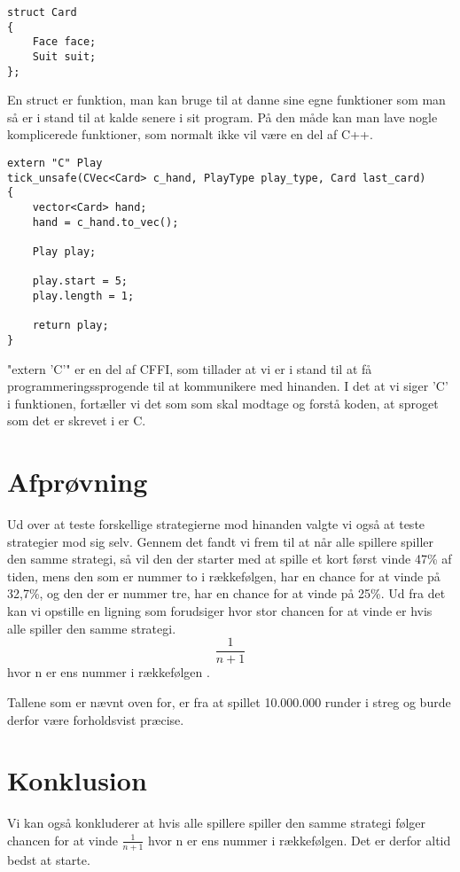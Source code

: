 \documentclass[a4paper, 12pt]{article}
\begin{document}
\begin{verbatim}
struct Card
{
	Face face;
	Suit suit;
};
\end{verbatim}
En struct er funktion, man kan bruge til at danne sine egne funktioner som man så er i stand til at kalde senere i sit program. På den måde kan man lave nogle komplicerede funktioner, som normalt ikke vil være en del af C++.
\pagebreak

\begin{verbatim}
extern "C" Play
tick_unsafe(CVec<Card> c_hand, PlayType play_type, Card last_card)
{
	vector<Card> hand;
	hand = c_hand.to_vec();

	Play play;

	play.start = 5;
	play.length = 1;

	return play;
}
\end{verbatim}
"extern 'C'" er en del af CFFI, som tillader at vi er i stand til at få programmeringssprogende til at kommunikere med hinanden. I det at vi siger 'C' i funktionen, fortæller vi det som som skal modtage og forstå koden, at sproget som det er skrevet i er C.
\vfill
\pagebreak

\begin{multicols}{2}
\section{Afprøvning}
Ud over at teste forskellige strategierne mod hinanden valgte vi også at teste strategier mod sig selv. Gennem det fandt vi frem til at når alle spillere spiller den samme strategi, så vil den der starter med at spille et kort først vinde 47\% af tiden, mens den som er nummer to i rækkefølgen, har en chance for at vinde på 32,7\%, og den der er nummer tre, har en chance for at vinde på 25\%. Ud fra det kan vi opstille en ligning som forudsiger hvor stor chancen for at vinde er hvis alle spiller den samme strategi.
$$\frac{1}{n+1}$$ hvor n er ens nummer i rækkefølgen . 

Tallene som er nævnt oven for, er fra at spillet 10.000.000 runder i streg og burde derfor være forholdsvist præcise. 

\section{Konklusion}


Vi kan også konkluderer at hvis alle spillere spiller den samme strategi følger chancen for at vinde $\frac{1}{n+1}$ hvor n er ens nummer i rækkefølgen. Det er derfor altid bedst at starte.
\bigbreak

\vfill
\pagebreak

\end{multicols}
\end{document}
